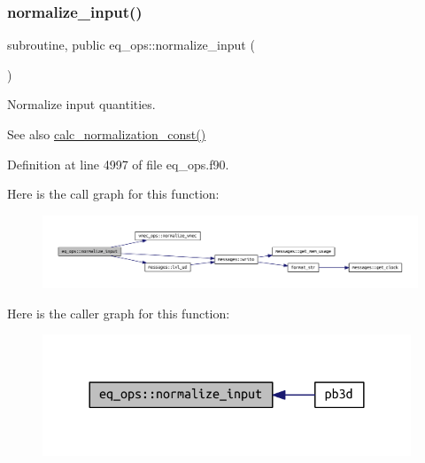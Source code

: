 \subsubsection{\texorpdfstring{normalize\+\_\+input()}{normalize\_input()}}
{\footnotesize\ttfamily subroutine, public eq\+\_\+ops\+::normalize\+\_\+input (\begin{DoxyParamCaption}{ }\end{DoxyParamCaption})}



Normalize input quantities. 

\begin{DoxySeeAlso}{See also}
\hyperlink{namespaceeq__ops_a7cd38586e386e1bc684a327ebcc4c1de}{calc\+\_\+normalization\+\_\+const()} 
\end{DoxySeeAlso}


Definition at line 4997 of file eq\+\_\+ops.\+f90.

Here is the call graph for this function\+:\nopagebreak
\begin{figure}[H]
\begin{center}
\leavevmode
\includegraphics[width=350pt]{namespaceeq__ops_a1b4c764da73624722d7e76498a2b80a9_cgraph}
\end{center}
\end{figure}
Here is the caller graph for this function\+:\nopagebreak
\begin{figure}[H]
\begin{center}
\leavevmode
\includegraphics[width=312pt]{namespaceeq__ops_a1b4c764da73624722d7e76498a2b80a9_icgraph}
\end{center}
\end{figure}
\mbox{\label{namespaceeq__ops_a8082c12510696bd8ffdd0deef41860c2}} 
